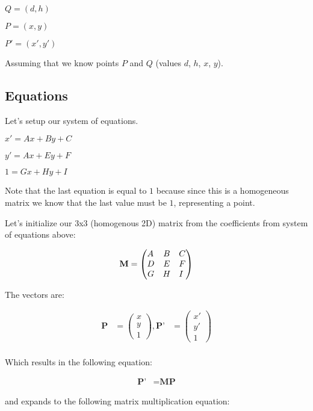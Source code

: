 \documentclass[12pt]{article}
\begin{document}
$Q = (d, h)$

$P = (x,y)$

$P' = (x', y')$

Assuming that we know points $P$ and $Q$ (values $d$, $h$, $x$, $y$).

\subsection{Equations}

Let's setup our system of equations.

$x' = Ax + By + C$

$y' = Ax + Ey + F$

$1  = Gx + Hy + I$

Note that the last equation is equal to $1$ because 
since this is a homogeneous matrix we know that the 
last value must be $1$, representing a point.

Let's initialize our 3x3 (homogenous 2D) matrix from the 
coefficients from system of equations above:

\begin{align}
\textbf{M} &=
\begin{pmatrix}
A \hfill & B & C \\
D & E & F \hfill \\
G & H & I \hfill 
\end{pmatrix} \nonumber \\
\end{align}

The vectors are:

\begin{align}
\textbf{P} &=
\begin{pmatrix}
x \\
y \\
1  
\end{pmatrix} \nonumber 
, 
\textbf{P'} &=
\begin{pmatrix}
x' \\
y' \\
1  
\end{pmatrix} \nonumber \\
\end{align}

Which results in the following equation:

\begin{align}
\textbf{P'} &= \textbf{M} \textbf{P}
\end{align}

and expands to the following matrix multiplication equation:
\end{document}
